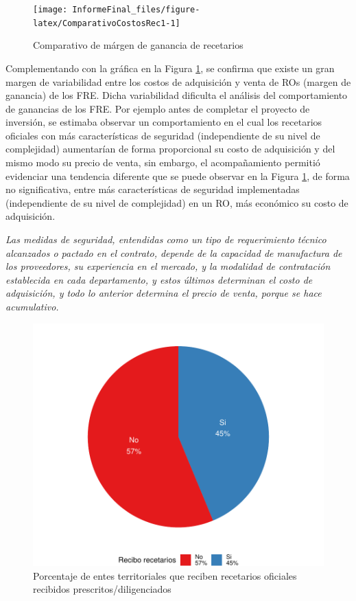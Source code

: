 \documentclass[
]{book}
\begin{document}
\begin{figure}
\texttt{[image: InformeFinal\_files/figure-latex/ComparativoCostosRec1-1]} \caption{Comparativo de márgen de ganancia de recetarios}\label{fig:ComparativoCostosRec1}
\end{figure}

Complementando con la gráfica en la Figura \ref{fig:ComparativoCostosRec1}, se confirma que existe un gran margen de variabilidad entre los costos de adquisición y venta de ROs (margen de ganancia) de los FRE. Dicha variabilidad dificulta el análisis del comportamiento de ganancias de los FRE. Por ejemplo antes de completar el proyecto de inversión, se estimaba observar un comportamiento en el cual los recetarios oficiales con más características de seguridad (independiente de su nivel de complejidad) aumentarían de forma proporcional su costo de adquisición y del mismo modo su precio de venta, sin embargo, el acompañamiento permitió evidenciar una tendencia diferente que se puede observar en la Figura \ref{fig:ComparativoCostosRec1}, de forma no significativa, entre más características de seguridad implementadas (independiente de su nivel de complejidad) en un RO, más económico su costo de adquisición.

\emph{Las medidas de seguridad, entendidas como un tipo de requerimiento técnico alcanzados o pactado en el contrato, depende de la capacidad de manufactura de los proveedores, su experiencia en el mercado, y la modalidad de contratación establecida en cada departamento, y estos últimos determinan el costo de adquisición, y todo lo anterior determina el precio de venta, porque se hace acumulativo.}

\begin{figure}
\includegraphics[width=0.85\linewidth]{InformeFinal_files/figure-latex/ReciboRecetariosInstituciones-1} \caption{Porcentaje de entes territoriales que reciben recetarios oficiales recibidos prescritos/diligenciados}\label{fig:ReciboRecetariosInstituciones}
\end{figure}
\end{document}
